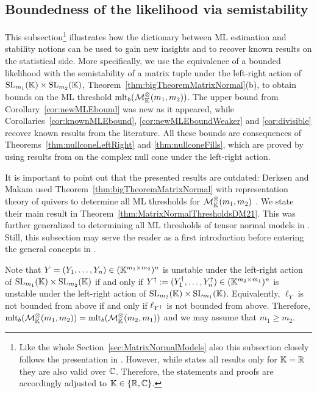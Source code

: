 \subsection{Boundedness of the likelihood via semistability} \label{subsec:MatrixNormalBoundedness}

This subsection\footnote{Like the whole Section~\ref{sec:MatrixNormalModels} also this subsection closely follows the presentation in \cite[Section~4]{SiagaPaper}. However, while \cite[Subsection~4.2]{SiagaPaper} states all results only for $\mathbb K = \mathbb R$ they are also valid over $\mathbb C$. Therefore, the statements and proofs are accordingly adjusted to $\mathbb K \in \{\mathbb R, \mathbb C\}$.}
illustrates how the dictionary between ML estimation and stability notions can be used to gain new insights and to recover known results on the statistical side. More specifically, we use the equivalence of a bounded likelihood with the semistability of a matrix tuple under the left-right action of $\operatorname{SL}_{m_1}(\mathbb K) \times \operatorname{SL}_{m_2}(\mathbb K)$, Theorem~\ref{thm:bigTheoremMatrixNormal}(b), to obtain bounds on the ML threshold $\operatorname{mlt}_b(\mathcal{M}^{\otimes}_{\mathbb{K}}(m_1,m_2))$. The upper bound from Corollary~\ref{cor:newMLEbound} was new as it appeared, while Corollaries~\ref{cor:knownMLEbound}, \ref{cor:newMLEboundWeaker} and \ref{cor:divisible} recover known results from the literature. All these bounds are consequences of Theorems~\ref{thm:nullconeLeftRight} and \ref{thm:nullconeFills}, which are proved by using results from \cite{BurginDraisma} on the complex null cone under the left-right action.

It is important to point out that the presented results are outdated: Derksen and Makam used Theorem~\ref{thm:bigTheoremMatrixNormal} with representation theory of quivers to determine all ML thresholds for $\mathcal{M}^{\otimes}_{\mathbb{K}}(m_1,m_2)$ \cite{DM21MatrixNormal}. We state their main result in Theorem~\ref{thm:MatrixNormalThresholdsDM21}. This was further generalized to determining all ML thresholds of tensor normal models in \cite{DMW22TensorNormal}. Still, this subsection may serve the reader as a first introduction before entering the general concepts in \cite{DM21MatrixNormal, DMW22TensorNormal}.

\begin{remark}\label{rem:DualityMatrixNormal}
	Note that $Y = (Y_1,\ldots,Y_n) \in (\mathbb K^{m_1 \times m_2})^n$ is unstable under the left-right action of $\operatorname{SL}_{m_1}(\mathbb K) \times \operatorname{SL}_{m_2}(\mathbb K)$ if and only if $Y^{\dagger} := (Y_1^{\dagger}, \ldots, Y_n^{\dagger}) \in (\mathbb K^{m_2 \times m_1})^n$ is unstable under the left-right action of $\operatorname{SL}_{m_2}(\mathbb K) \times \operatorname{SL}_{m_1}(\mathbb K)$. Equivalently, $\ell_Y$ is not bounded from above if and only if $\ell_{Y^{\dagger}}$ is not bounded from above.
	Therefore, $\operatorname{mlt}_b(\mathcal{M}^{\otimes}_{\mathbb{K}}(m_1,m_2)) = \operatorname{mlt}_b(\mathcal{M}^{\otimes}_{\mathbb{K}}(m_2,m_1))$ and we may assume that $m_1 \geq m_2$.
	\hfill\remSymbol
\end{remark}

